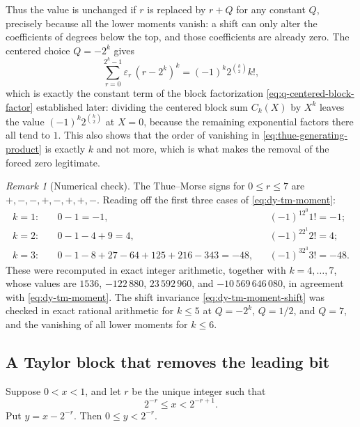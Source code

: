 \documentclass[11pt,oneside]{article}
\theoremstyle{definition}
\theoremstyle{remark}
\newtheorem{remark}[theorem]{Remark}
\begin{document}
Thus the value is unchanged if $r$ is replaced by $r+Q$ for any constant $Q$, precisely
because all the lower moments vanish: a shift can only alter the coefficients of degrees
below the top, and those coefficients are already zero.  The centered choice $Q=-2^k$ gives
\begin{equation}
 \sum_{r=0}^{2^k-1}\varepsilon_r\,(r-2^k)^k=(-1)^k2^{\binom k2}k!,
                                                               \label{eq:dy-tm-moment-centered}
\end{equation}
which is exactly the constant term of the block factorization
\eqref{eq:q-centered-block-factor} established later: dividing the centered block sum
$C_k(X)$ by $X^k$ leaves the value $(-1)^k2^{\binom k2}$ at $X=0$, because the remaining
exponential factors there all tend to $1$.  This also shows
that the order of vanishing in \eqref{eq:thue-generating-product} is exactly $k$ and not
more, which is what makes the removal of the forced zero legitimate.

\begin{remark}[Numerical check]
\label{rem:dy-tm-moment-check}
The Thue--Morse signs for $0\le r\le7$ are $+,-,-,+,-,+,+,-$.  Reading off the first three
cases of \eqref{eq:dy-tm-moment}:
\begin{align*}
 k=1:&\quad 0-1=-1, &&(-1)^12^{0}1!=-1;\\
 k=2:&\quad 0-1-4+9=4, &&(-1)^22^{1}2!=4;\\
 k=3:&\quad 0-1-8+27-64+125+216-343=-48, &&(-1)^32^{3}3!=-48.
\end{align*}
These were recomputed in exact integer arithmetic, together with $k=4,\ldots,7$, whose values
are $1536$, $-122\,880$, $23\,592\,960$, and $-10\,569\,646\,080$, in agreement with
\eqref{eq:dy-tm-moment}.  The shift invariance \eqref{eq:dy-tm-moment-shift} was checked in
exact rational arithmetic for $k\le5$ at $Q=-2^k$, $Q=1/2$, and $Q=7$, and the vanishing of
all lower moments for $k\le6$.
\end{remark}

\subsection{A Taylor block that removes the leading bit}

Suppose $0<x<1$, and let $r$ be the unique integer such that
\begin{equation}
 2^{-r}\le x<2^{-r+1}.                                    \label{eq:dyadic-shell}
\end{equation}
Put $y=x-2^{-r}$.  Then $0\le y<2^{-r}$.
\end{document}
